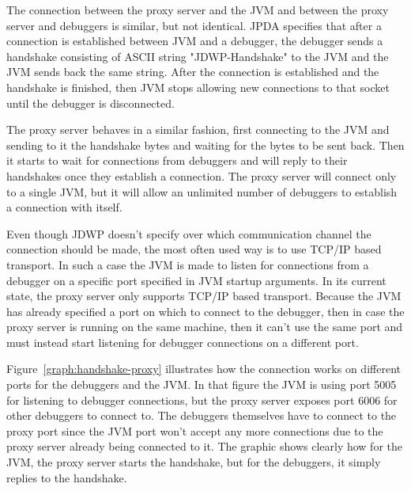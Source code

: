 \documentclass[..thesis.tex]{subfiles}
\begin{document}
The connection between the proxy server and the JVM and between the proxy server and debuggers is similar, but not identical.
JPDA specifies that after a connection is established between JVM and a debugger, the debugger sends a handshake consisting of ASCII string "JDWP-Handshake" to the JVM and the JVM sends back the same string.
After the connection is established and the handshake is finished, then JVM stops allowing new connections to that socket until the debugger is disconnected.

The proxy server behaves in a similar fashion, first connecting to the JVM and sending to it the handshake bytes and waiting for the bytes to be sent back.
Then it starts to wait for connections from debuggers and will reply to their handshakes once they establish a connection.
The proxy server will connect only to a single JVM, but it will allow an unlimited number of debuggers to establish a connection with itself.

Even though JDWP doesn't specify over which communication channel the connection should be made, the most often used way is to use TCP/IP based transport.
In such a case the JVM is made to listen for connections from a debugger on a specific port specified in JVM startup arguments.
In its current state, the proxy server only supports TCP/IP based transport.
Because the JVM has already specified a port on which to connect to the debugger, then in case the proxy server is running on the same machine, then it can't use the same port and must instead start listening for debugger connections on a different port.



Figure~\ref{graph:handshake-proxy} illustrates how the connection works on different ports for the debuggers and the JVM.
In that figure the JVM is using port 5005 for listening to debugger connections, but the proxy server exposes port 6006 for other debuggers to connect to.
The debuggers themselves have to connect to the proxy port since the JVM port won't accept any more connections due to the proxy server already being connected to it.
The graphic shows clearly how for the JVM, the proxy server starts the handshake, but for the debuggers, it simply replies to the handshake.
\end{document}
